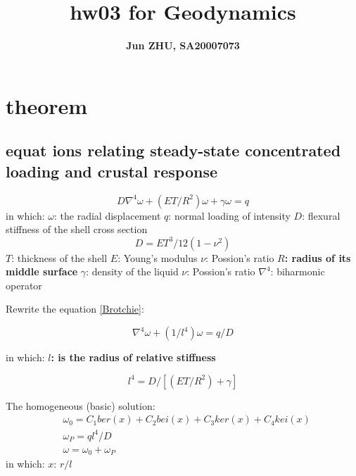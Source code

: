 \documentclass{article}
\title{\textbf{hw03 for Geodynamics}}
\author{\textbf{Jun ZHU, SA20007073}}
\begin{document}
\maketitle
\section{theorem}
\subsection{equat
ions relating steady-state concentrated loading and crustal response}
\begin{equation}\label{Brotchie}
D\nabla^4\omega+(ET/R^2)\omega+\gamma\omega=q
\end{equation}
in which:\newline
$\omega$: the radial displacement\newline
$q$: normal loading of intensity\newline
$D$: flexural stiffness of the shell cross section\newline
\begin{equation}
D=ET^3/12(1-\nu^2)
\end{equation}
$T$: thickness of the shell\newline
$E$: Young's modulus\newline
$\nu$: Possion's ratio\newline
\textbf{$R$: radius of its middle surface\newline}
$\gamma$: density of the liquid\newline
$\nu$: Possion's ratio\newline
$\nabla^4$: biharmonic operator\newline

Rewrite the equation \ref{Brotchie}:

\begin{equation}\label{rewritten}
\nabla^4\omega+(1/l^4)\omega=q/D
\end{equation}

in which:\newline
\textbf{$l$: is the radius of relative stiffness}

\begin{equation}
l^4=D/[(ET/R^2)+\gamma]
\end{equation}

The homogeneous (basic) solution:\newline
\begin{subequations}\label{solution}
\begin{align*}
&\omega_0=C_1ber(x)+C_2bei(x)+C_3ker(x)+C_4kei(x)\\ 
&\omega_P=ql^4/D\\
&\omega=\omega_0+\omega_P
\end{align*}
\end{subequations}
in which:\newline
$x$: $r/l$
\end{document}
